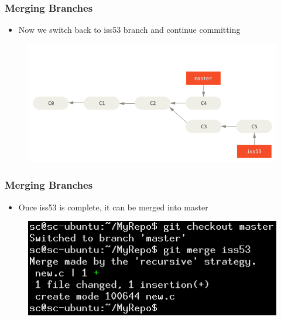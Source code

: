 \documentclass{beamer}
\begin{document}
\begin{frame}
	\frametitle{Merging Branches}
	\begin{itemize}
		\item{Now we switch back to iss53 branch and continue committing}
	\end{itemize}
	\begin{figure}
		\includegraphics[scale=0.37]{Merging_Branches-5.png}
	\end{figure}
\end{frame}

\begin{frame}
	\frametitle{Merging Branches}
	\begin{itemize}
		\item{Once iss53 is complete, it can be merged into master}
	\end{itemize}
	\begin{figure}
		\includegraphics[scale=0.6]{Merging_Branches-6.png}
	\end{figure}
\end{frame}
\end{document}
